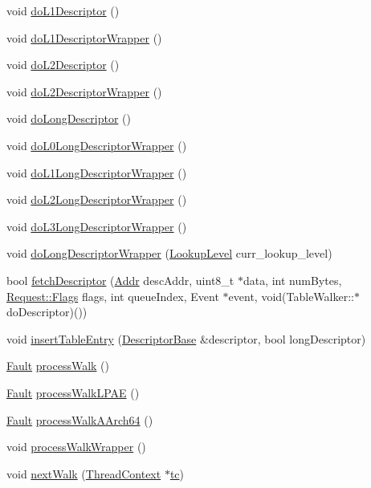 \begin{DoxyCompactItemize}
\item 
void \hyperlink{classArmISA_1_1TableWalker_a837a539f5e07e8785902d5854efde98d}{doL1Descriptor} ()
\item 
void \hyperlink{classArmISA_1_1TableWalker_a0498be5140a67703440d5ebdc2916173}{doL1DescriptorWrapper} ()
\item 
void \hyperlink{classArmISA_1_1TableWalker_a45b9877779ac070b7779f7e1eccdd05e}{doL2Descriptor} ()
\item 
void \hyperlink{classArmISA_1_1TableWalker_a87d50eb887f4953c0b6881863b71df37}{doL2DescriptorWrapper} ()
\item 
void \hyperlink{classArmISA_1_1TableWalker_abba315db7bc859eeb10035be0dcc1168}{doLongDescriptor} ()
\item 
void \hyperlink{classArmISA_1_1TableWalker_a5c436908eca38a39cb98c4dedbf7228c}{doL0LongDescriptorWrapper} ()
\item 
void \hyperlink{classArmISA_1_1TableWalker_adbdea710854a60040764157e313f730c}{doL1LongDescriptorWrapper} ()
\item 
void \hyperlink{classArmISA_1_1TableWalker_adf9dfadd21c55c07039abb1f1931be60}{doL2LongDescriptorWrapper} ()
\item 
void \hyperlink{classArmISA_1_1TableWalker_acc94f58219aff10336e1a78c77604dbb}{doL3LongDescriptorWrapper} ()
\item 
void \hyperlink{classArmISA_1_1TableWalker_a6a293b1492cb952d30d4b0de42aa9e7e}{doLongDescriptorWrapper} (\hyperlink{namespaceArmISA_aefa4213b348e38ee69f2a6109563a7bd}{LookupLevel} curr\_\-lookup\_\-level)
\item 
bool \hyperlink{classArmISA_1_1TableWalker_a583b81ca3090f4eb8014ec261cadeb6e}{fetchDescriptor} (\hyperlink{classm5_1_1params_1_1Addr}{Addr} descAddr, uint8\_\-t $\ast$data, int numBytes, \hyperlink{classFlags}{Request::Flags} flags, int queueIndex, Event $\ast$event, void(TableWalker::$\ast$doDescriptor)())
\item 
void \hyperlink{classArmISA_1_1TableWalker_aad13c1fc4ab80d03d2af5ac43f41be23}{insertTableEntry} (\hyperlink{classArmISA_1_1TableWalker_1_1DescriptorBase}{DescriptorBase} \&descriptor, bool longDescriptor)
\item 
\hyperlink{classRefCountingPtr}{Fault} \hyperlink{classArmISA_1_1TableWalker_a13d6e703bfb2074a12535d21689a16d5}{processWalk} ()
\item 
\hyperlink{classRefCountingPtr}{Fault} \hyperlink{classArmISA_1_1TableWalker_a81c7003e58d3e96e25e66f221701669e}{processWalkLPAE} ()
\item 
\hyperlink{classRefCountingPtr}{Fault} \hyperlink{classArmISA_1_1TableWalker_a8530d760b97c61b1bf18de8228c3aa90}{processWalkAArch64} ()
\item 
void \hyperlink{classArmISA_1_1TableWalker_a3e744e2a92a9edac5d9859823bb1ccc8}{processWalkWrapper} ()
\item 
void \hyperlink{classArmISA_1_1TableWalker_ae126e9ab023c3e4659836daa8f5364be}{nextWalk} (\hyperlink{classThreadContext}{ThreadContext} $\ast$\hyperlink{namespaceArmISA_a5aff829af55e65b802d83dfcef4e9dd0}{tc})
\end{DoxyCompactItemize}
